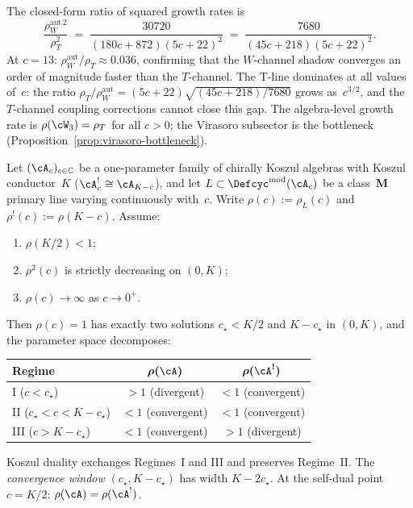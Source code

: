\begin{example}
\noindent
The closed-form ratio of squared growth rates is
\begin{equation}\label{eq:w3-growth-ratio}
  \frac{\rho_W^{\mathrm{aut}\,2}}{\rho_T^2}
  \;=\;
  \frac{30720}{(180c{+}872)(5c{+}22)^2}
  \;=\;
  \frac{7680}{(45c{+}218)(5c{+}22)^2}.
\end{equation}
At $c = 13$:
$\rho_W^{\mathrm{aut}}/\rho_T \approx 0.036$,
confirming that the $W$-channel shadow converges
an order of magnitude faster than the $T$-channel.
The T-line dominates at all values of~$c$:
the ratio $\rho_T/\rho_W^{\mathrm{aut}}
= (5c{+}22)\sqrt{(45c{+}218)/7680}$
grows as~$c^{3/2}$, and the $T$-channel coupling
corrections cannot close this gap.
The algebra-level growth rate is
$\rho(\cW_3) = \rho_T$
for all $c > 0$; the Virasoro subsector is the
bottleneck
\textup{(}Proposition~\textup{\ref{prop:virasoro-bottleneck}}).
\end{example}

\begin{theorem}
\label{thm:koszul-exchange-regimes}
\ClaimStatusProvedHere
{}
Let $(\cA_c)_{c \in \mathbb{C}}$ be a
one-parameter family of chirally Koszul algebras
with Koszul conductor~$K$
\textup{(}$\cA_c^! \cong \cA_{K-c}$\textup{)},
and let $L \subset \Defcyc^{\mathrm{mod}}(\cA_c)$
be a class~$\mathbf{M}$ primary line varying
continuously with~$c$.  Write $\rho(c) := \rho_L(c)$
and $\rho^!(c) := \rho(K{-}c)$.
Assume:
\begin{enumerate}[label=\textup{(\alph*)}]
\item $\rho(K/2) < 1$;
\item $\rho^2(c)$ is strictly decreasing on $(0, K)$;
\item $\rho(c) \to \infty$ as $c \to 0^+$.
\end{enumerate}
Then $\rho(c) = 1$ has exactly two solutions
$c_\star < K/2$ and $K - c_\star$ in $(0, K)$,
and the parameter space decomposes:
\begin{center}
\renewcommand{\arraystretch}{1.2}
\begin{tabular}{lcc}
\toprule
\textbf{Regime} & $\boldsymbol{\rho(\cA)}$ &
  $\boldsymbol{\rho(\cA^!)}$ \\
\midrule
\textup{I} ($c < c_\star$)
  & $> 1$ \textup{(}divergent\textup{)}
  & $< 1$ \textup{(}convergent\textup{)} \\
\textup{II} ($c_\star < c < K - c_\star$)
  & $< 1$ \textup{(}convergent\textup{)}
  & $< 1$ \textup{(}convergent\textup{)} \\
\textup{III} ($c > K - c_\star$)
  & $< 1$ \textup{(}convergent\textup{)}
  & $> 1$ \textup{(}divergent\textup{)} \\
\bottomrule
\end{tabular}
\end{center}
\noindent
Koszul duality exchanges Regimes~I and III and
preserves Regime~II.  The \emph{convergence window}
$(c_\star, K - c_\star)$ has width $K - 2c_\star$.
At the self-dual point $c = K/2$:
$\rho(\cA) = \rho(\cA^!)$.
\end{theorem}

